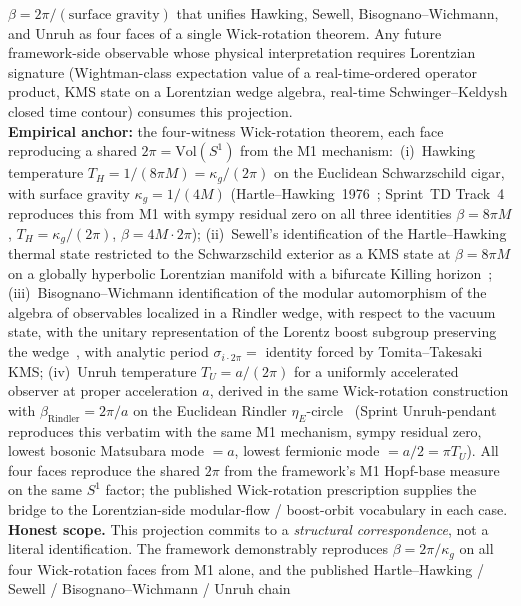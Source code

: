 $\beta = 2\pi / (\text{surface gravity})$ that unifies Hawking,
Sewell, Bisognano--Wichmann, and Unruh as four faces of a single
Wick-rotation theorem.  Any future framework-side observable whose
physical interpretation requires Lorentzian signature (Wightman-class
expectation value of a real-time-ordered operator product, KMS state
on a Lorentzian wedge algebra, real-time Schwinger--Keldysh closed
time contour) consumes this projection.\\
\textbf{Empirical anchor:} the four-witness Wick-rotation theorem,
each face reproducing a shared $2\pi = \mathrm{Vol}(S^1)$ from the
M1 mechanism:\
(i)~Hawking temperature $T_H = 1/(8\pi M) = \kappa_g / (2\pi)$ on the
Euclidean Schwarzschild cigar, with surface gravity
$\kappa_g = 1/(4M)$ (Hartle--Hawking~1976~\cite{hartle_hawking1976};
Sprint~TD Track~4 reproduces this from M1 with sympy residual zero
on all three identities $\beta = 8\pi M$, $T_H = \kappa_g/(2\pi)$,
$\beta = 4M \cdot 2\pi$);
(ii)~Sewell's identification of the Hartle--Hawking thermal state
restricted to the Schwarzschild exterior as a KMS state at
$\beta = 8\pi M$ on a globally hyperbolic Lorentzian manifold with
a bifurcate Killing horizon~\cite{sewell1982};
(iii)~Bisognano--Wichmann identification of the modular automorphism
of the algebra of observables localized in a Rindler wedge, with
respect to the vacuum state, with the unitary representation of the
Lorentz boost subgroup preserving the
wedge~\cite{bisognano_wichmann1976}, with analytic period
$\sigma_{i \cdot 2\pi} = $ identity forced by Tomita--Takesaki KMS;
(iv)~Unruh temperature $T_U = a / (2\pi)$ for a uniformly accelerated
observer at proper acceleration $a$, derived in the same Wick-rotation
construction with $\beta_{\mathrm{Rindler}} = 2\pi / a$ on the
Euclidean Rindler $\eta_E$-circle~\cite{unruh1976} (Sprint
Unruh-pendant reproduces this verbatim with the same M1 mechanism,
sympy residual zero, lowest bosonic Matsubara mode $= a$, lowest
fermionic mode $= a/2 = \pi T_U$).
All four faces reproduce the shared $2\pi$ from the framework's
M1 Hopf-base measure on the same $S^1$ factor; the published
Wick-rotation prescription supplies the bridge to the Lorentzian-side
modular-flow / boost-orbit vocabulary in each case.\\
\textbf{Honest scope.}  This projection commits to a
\emph{structural correspondence}, not a literal identification.
The framework demonstrably reproduces $\beta = 2\pi / \kappa_g$ on
all four Wick-rotation faces from M1 alone, and the published
Hartle--Hawking / Sewell / Bisognano--Wichmann / Unruh chain
